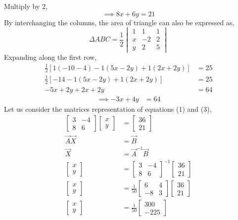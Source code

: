 \documentclass[journal,12pt,twocolumn]{IEEEtran}
\begin{document}
Multiply by 2,
\begin{equation}
 \implies 8x+6y=21    
\end{equation}
\noindent
\newpage
\noindent
By interchanging the columns, the area of triangle can also be expressed as,
$$\Delta ABC=\frac{1}{2}\begin{vmatrix}
1 & 1 & 1\\ 
x & -2 & 2\\ 
y & 2 & 5
\end{vmatrix}$$
\noindent
Expanding along the first row,
\begin{align*}
\frac{1}{2}\left [ 1(-10-4)-1(5x-2y)+1(2x+2y) \right ] &= 25 \\
\frac{1}{2}\left [-14-1(5x-2y)+1(2x+2y) \right ] &= 25 \\
-5x+2y+2x+2y &= 64
\end{align*}
 \begin{align}
    \implies  -3x+4y &= 64   
 \end{align}
Let us consider the matrices representation of equations (1) and (3),
\begin{align*}
\begin{bmatrix}
3 & -4 \\
8 & 6 
\end{bmatrix}
\begin{bmatrix}
x \\ y
\end{bmatrix}
& =
\begin{bmatrix}
36 \\ 21
\end{bmatrix} \\[6pt]
  \vec{A}\vec{X} &=\vec{B} \\[6pt]
  \vec{X} &= \vec{A}^{-1}\vec{B} \\[6pt]
\begin{bmatrix}
x \\ y
\end{bmatrix}
& =
\begin{bmatrix}
3 & -4 \\
8 & 6 
\end{bmatrix}^{-1}
\begin{bmatrix}
36 \\ 21
\end{bmatrix}  \\[6pt]
\begin{bmatrix}
x \\ y
\end{bmatrix}
& =
\frac{1}{50}
\begin{bmatrix}
6 & 4 \\
-8 & 3 
\end{bmatrix}
\begin{bmatrix}
36 \\ 21
\end{bmatrix} \\[6pt]
\begin{bmatrix}
x \\ y
\end{bmatrix}
& =
\frac{1}{50}
\begin{bmatrix}
300 \\ -225
\end{bmatrix}
\end{align*}
\end{document}
